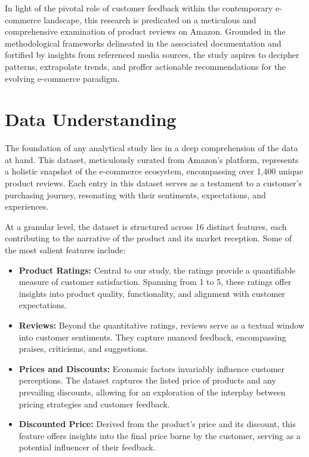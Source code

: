 \documentclass[12pt]{article}
\begin{document}
In light of the pivotal role of customer feedback within the contemporary e-commerce landscape, this research is predicated on a meticulous and comprehensive examination of product reviews on Amazon. Grounded in the methodological frameworks delineated in the associated documentation and fortified by insights from referenced media sources, the study aspires to decipher patterns, extrapolate trends, and proffer actionable recommendations for the evolving e-commerce paradigm.

\section{Data Understanding}

The foundation of any analytical study lies in a deep comprehension of the data at hand. This dataset, meticulously curated from Amazon's platform, represents a holistic snapshot of the e-commerce ecosystem, encompassing over 1,400 unique product reviews. Each entry in this dataset serves as a testament to a customer's purchasing journey, resonating with their sentiments, expectations, and experiences.

At a granular level, the dataset is structured across 16 distinct features, each contributing to the narrative of the product and its market reception. Some of the most salient features include:

\begin{itemize}
    \item \textbf{Product Ratings:} Central to our study, the ratings provide a quantifiable measure of customer satisfaction. Spanning from 1 to 5, these ratings offer insights into product quality, functionality, and alignment with customer expectations.
    
    \item \textbf{Reviews:} Beyond the quantitative ratings, reviews serve as a textual window into customer sentiments. They capture nuanced feedback, encompassing praises, criticisms, and suggestions.
    
    \item \textbf{Prices and Discounts:} Economic factors invariably influence customer perceptions. The dataset captures the listed price of products and any prevailing discounts, allowing for an exploration of the interplay between pricing strategies and customer feedback.
    
    \item \textbf{Discounted Price:} Derived from the product's price and its discount, this feature offers insights into the final price borne by the customer, serving as a potential influencer of their feedback.
\end{itemize}
\end{document}
